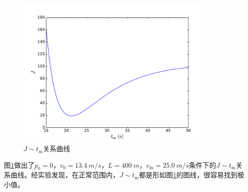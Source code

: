 \begin{figure}
\centering
\includegraphics[width=10cm]{figures/tm.pdf}
\caption{$J\sim t_\mathrm{m}$关系曲线}
\label{fig:tm}
\end{figure}

图\ref{fig:tm}做出了$p_0=0$，$v_0=\SI{13.4}{m\per s}$，$L=\SI{400}{m}$，$v_\mathrm{m}=\SI{25.0}{m\per s}$条件下的$J\sim t_\mathrm{m}$关系曲线。经实验发现，在正常范围内，$J\sim t_\mathrm{m}$都是形如图\ref{fig:tm}的图线，很容易找到极小值。

